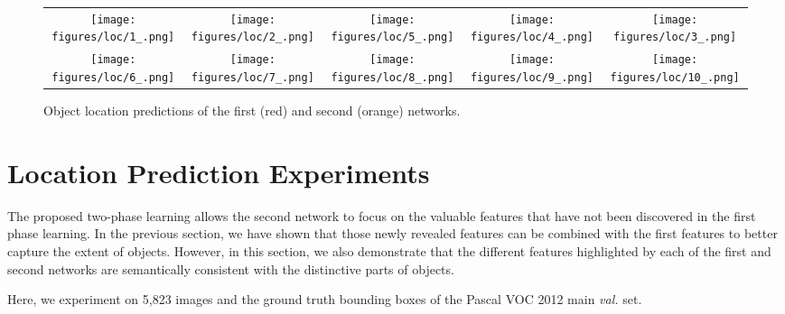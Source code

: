 \documentclass[10pt,twocolumn,letterpaper]{article}
\begin{document}
\begin{figure*}
\begin{center}
\def\arraystretch{0.5}
\begin{tabular}{@{}c@{\hskip 0.01\linewidth}c@{\hskip 0.01\linewidth}c@{\hskip 0.01\linewidth}c@{\hskip 0.01\linewidth}c@{}}
\texttt{[image: figures/loc/1\_.png]} &
\texttt{[image: figures/loc/2\_.png]} &
\texttt{[image: figures/loc/5\_.png]} &
\texttt{[image: figures/loc/4\_.png]} &
\texttt{[image: figures/loc/3\_.png]} \\
\texttt{[image: figures/loc/6\_.png]} &
\texttt{[image: figures/loc/7\_.png]} &
\texttt{[image: figures/loc/8\_.png]} &
\texttt{[image: figures/loc/9\_.png]} &
\texttt{[image: figures/loc/10\_.png]} \\
\end{tabular}
\end{center}
\vspace{-0.1in}
\caption{Object location predictions of the first (red) and second (orange) networks.}
\label{fig:location}
\end{figure*}



\section{Location Prediction Experiments}
\label{sec:location}
The proposed two-phase learning allows the second network to focus on the valuable features that have not been discovered in the first phase learning. In the previous section, we have shown that those newly revealed features can be combined with the first features to better capture the extent of objects. However, in this section, we also demonstrate that the different features highlighted by each of the first and second networks are semantically consistent with the distinctive parts of objects.

Here, we experiment on 5,823 images and the ground truth bounding boxes of the Pascal VOC 2012 main \textit{val.} set.
\end{document}
